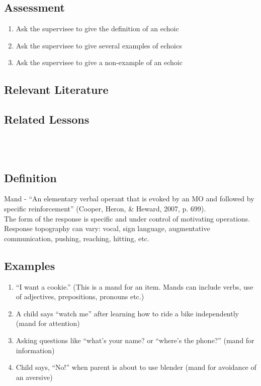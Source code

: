 \subsection{Assessment}
\begin{enumerate}
\item Ask the supervisee to give the definition of an echoic
\item Ask the supervisee to give several examples of echoics
\item Ask the supervisee to give a non-example of an echoic 
%
\end{enumerate}
%
\subsection{Relevant Literature}
\begin{refsection}
\nocite{cooper2014applied,
        sundberg2008verbal,
        skinner1957verbal}
\printbibliography[heading=none]
\end{refsection} 
%
\subsection{Related Lessons}
\fourdFour{}\\
\fourdTen{}\\
%
\subsection{Definition}
Mand - ``An elementary verbal operant that is evoked by an MO and followed by specific reinforcement'' (Cooper, Heron, \& Heward, 2007, p. 699).\\

The form of the response is specific and under control of motivating operations. Response topography can vary: vocal, sign language, augmentative communication, pushing, reaching, hitting, etc.
%
\subsection{Examples}
\begin{enumerate}
\item ``I want a cookie.'' (This is a mand for an item. Mands can include verbs, use of adjectives, prepositions, pronouns etc.)
\item A child says ``watch me'' after learning how to ride a bike independently (mand for attention)
\item Asking questions like ``what's your name? or ``where's the phone?'' (mand for information)
\item Child says, ``No!'' when parent is about to use blender (mand for avoidance of an aversive)
%

%
\end{enumerate}
%
